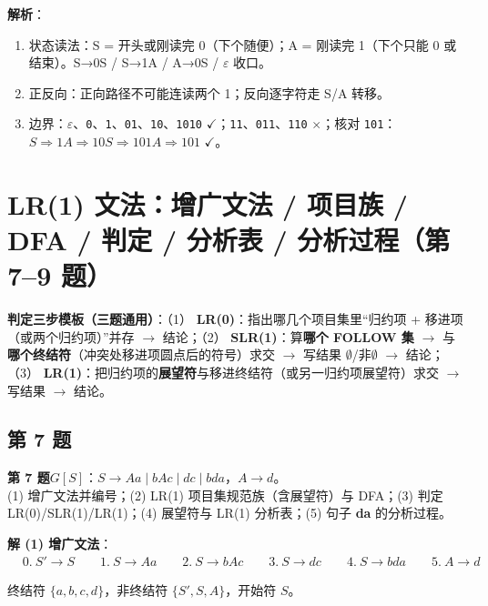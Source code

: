 \documentclass[12pt,a4paper,fontset=windows]{ctexart}
\newcommand{\ok}{\ensuremath{\checkmark}}
\newcommand{\bad}{\ensuremath{\times}}
\begin{document}
\textbf{解析}：
\begin{enumerate}
\item 状态读法：S = 开头或刚读完 0（下个随便）；A = 刚读完 1（下个只能 0 或结束）。S→0S / S→1A / A→0S / $\varepsilon$ 收口。
\item 正反向：正向路径不可能连读两个 1；反向逐字符走 S/A 转移。
\item 边界：$\varepsilon$、\texttt{0}、\texttt{1}、\texttt{01}、\texttt{10}、\texttt{1010} \ok；\texttt{11}、\texttt{011}、\texttt{110} \bad；核对 \texttt{101}：$S \Rightarrow 1A \Rightarrow 10S \Rightarrow 101A \Rightarrow 101$ \ok。
\end{enumerate}

\section{\texorpdfstring{LR(1) 文法：增广文法 / 项目族 / DFA / 判定 / 分析表 / 分析过程（第 7--9 题）}{LR(1) 文法（第 7–9 题）}}

\begin{infobox}
\textbf{判定三步模板（三题通用）}：（1） \textbf{LR(0)}：指出哪几个项目集里``归约项 + 移进项（或两个归约项）''并存 $\to$ 结论；（2） \textbf{SLR(1)}：算\textbf{哪个 FOLLOW 集} $\to$ 与\textbf{哪个终结符}（冲突处移进项圆点后的符号）求交 $\to$ 写结果 $\emptyset$/非$\emptyset$ $\to$ 结论；（3） \textbf{LR(1)}：把归约项的\textbf{展望符}与移进终结符（或另一归约项展望符）求交 $\to$ 写结果 $\to$ 结论。
\end{infobox}

\subsection*{第 7 题}

\begin{qbox}
{\large\bfseries 第 7 题}\quad $G[S]$：$S \to Aa \mid bAc \mid dc \mid bda$，$A \to d$。\\
(1) 增广文法并编号；(2) LR(1) 项目集规范族（含展望符）与 DFA；(3) 判定 LR(0)/SLR(1)/LR(1)；(4) 展望符与 LR(1) 分析表；(5) 句子 \textbf{da} 的分析过程。
\end{qbox}

\textbf{解 (1) 增广文法}：
\[
\begin{aligned}
& 0.\ S' \to S \qquad 1.\ S \to Aa \qquad 2.\ S \to bAc \qquad 3.\ S \to dc \qquad 4.\ S \to bda \qquad 5.\ A \to d
\end{aligned}
\]

终结符 $\{a,b,c,d\}$，非终结符 $\{S',S,A\}$，开始符 $S$。
\end{document}
